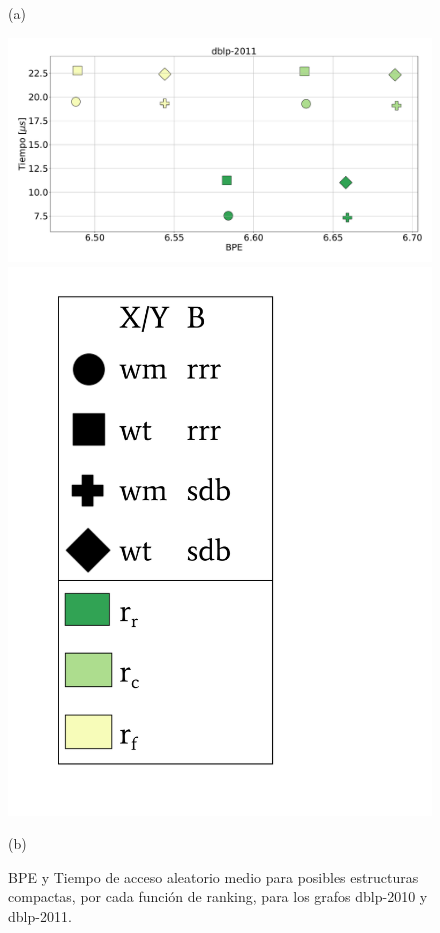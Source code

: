 \begin{figure}
\begin{minipage}{1\textwidth}
    			(a)		
    	\end{minipage}
    	
       	\begin{minipage}{1\textwidth}
    			\centering
    			\begin{minipage}{0.8\textwidth}
    				\centering
    				\includegraphics[width=1\linewidth]{img/sdsl/aleatorioBig/dblp-2011.pdf}
    			\end{minipage}
    			\begin{minipage}{0.15\textwidth}
    				\centering
    				\includegraphics[scale=.22, clip, trim=70 0 0 0]{img/sdsl/label.pdf}
    			\end{minipage}
    			
    			(b)		
    	\end{minipage}
    	
    \caption{BPE y Tiempo de acceso aleatorio medio para posibles estructuras compactas, por cada función de ranking, para los grafos dblp-2010 y dblp-2011.}
    \label{fig:sdslBPEAle3}
\end{figure}
